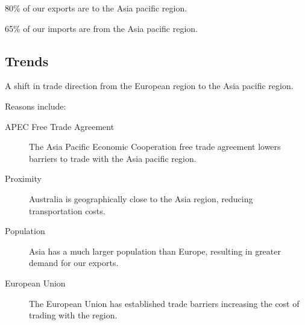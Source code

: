 \documentclass[a4paper,11pt]{article}
\begin{document}
80\% of our exports are to the Asia pacific region.

65\% of our imports are from the Asia pacific region.


\subsection{Trends}

A shift in trade direction from the European region to the Asia pacific region.

Reasons include:

\begin{description}
\item [APEC Free Trade Agreement] The Asia Pacific Economic Cooperation free
	trade agreement lowers barriers to trade with the Asia pacific region.
\item [Proximity] Australia is geographically close to the Asia region,
	reducing transportation costs.
\item [Population] Asia has a much larger population than Europe, resulting in
	greater demand for our exports.
\item [European Union] The European Union has established trade barriers
	increasing the cost of trading with the region.
\end{description}
\end{document}
